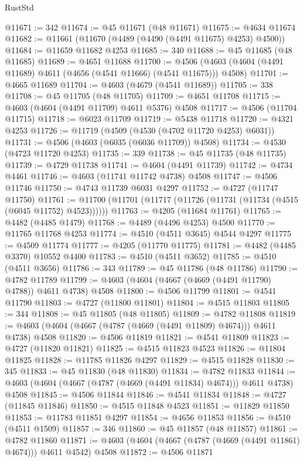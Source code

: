 \begin{lexlean}{RustStd}
\begin{coremodule}
@11671 := 342
@11674 := @45 @11671 (@48 @11671)
@11675 := @4634 @11674
@11682 := @11661 (@11670 (@4489 (@4490 (@4491 @11675) @4253) @4500))
@11684 := @11659 @11682 @4253
@11685 := 340
@11688 := @45 @11685 (@48 @11685)
@11689 := @4651 @11688
@11700 := @4506 (@4603 (@4604 (@4491 @11689) @4611 (@4656 (@4541 @11666) (@4541 @11675))) @4508)
@11701 := @4665 @11689
@11704 := @4603 (@4679 (@4541 @11689))
@11705 := 338
@11708 := @45 @11705 (@48 @11705)
@11709 := @4651 @11708
@11715 := @4603 (@4604 (@4491 @11709) @4611 @5376) @4508
@11717 := @4506 (@11704 @11715)
@11718 := @6023 @11709
@11719 := @5438 @11718
@11720 := @4321 @4253
@11726 := @11719 (@4509 (@4530 (@4702 @11720 @4253) @6031))
@11731 := @4506 (@4603 (@6035 (@6036 @11709)) @4508)
@11734 := @4530 (@4723 @11720 @4253)
@11735 := 339
@11738 := @45 @11735 (@48 @11735)
@11739 := @4729 @11738
@11741 := @4604 (@4491 @11739)
@11742 := @4734 @4461
@11746 := @4603 (@11741 @11742 @4738) @4508
@11747 := @4506 @11746
@11750 := @4743 @11739 @6031 @4297
@11752 := @4727 (@11747 @11750)
@11761 := @11700 (@11701 (@11717 (@11726 (@11731 (@11734 (@4515 (@6045 @11752) @4523))))))
@11763 := @4205 (@11684 @11761)
@11765 := @4482 (@4485 @1479)
@11768 := @4489 (@4496 @4253) @4500
@11770 := @11765 @11768 @4253
@11774 := @4510 (@4511 @3645) @4544 @4297
@11775 := @4509 @11774
@11777 := @4205 (@11770 @11775)
@11781 := @4482 (@4485 @3370) @10552 @4400
@11783 := @4510 (@4511 @3652)
@11785 := @4510 (@4511 @3656)
@11786 := 343
@11789 := @45 @11786 (@48 @11786)
@11790 := @4782 @11789
@11799 := @4603 (@4604 (@4667 (@4669 (@4491 @11790) @4788)) @4611 @4738) @4508
@11800 := @4506 @11799
@11801 := @4541 @11790
@11803 := @4727 (@11800 @11801)
@11804 := @4515 @11803
@11805 := 344
@11808 := @45 @11805 (@48 @11805)
@11809 := @4782 @11808
@11819 := @4603 (@4604 (@4667 (@4787 (@4669 (@4491 @11809) @4674))) @4611 @4738) @4508
@11820 := @4506 @11819
@11821 := @4541 @11809
@11823 := @4727 (@11820 @11821)
@11825 := @4515 @11823 @4523
@11826 := @11804 @11825
@11828 := @11785 @11826 @4297
@11829 := @4515 @11828
@11830 := 345
@11833 := @45 @11830 (@48 @11830)
@11834 := @4782 @11833
@11844 := @4603 (@4604 (@4667 (@4787 (@4669 (@4491 @11834) @4674))) @4611 @4738) @4508
@11845 := @4506 @11844
@11846 := @4541 @11834
@11848 := @4727 (@11845 @11846)
@11850 := @4515 @11848 @4523
@11851 := @11829 @11850
@11853 := @11783 @11851 @4297
@11854 := @4656 @11853
@11856 := @4510 (@4511 @1509)
@11857 := 346
@11860 := @45 @11857 (@48 @11857)
@11861 := @4782 @11860
@11871 := @4603 (@4604 (@4667 (@4787 (@4669 (@4491 @11861) @4674))) @4611 @4542) @4508
@11872 := @4506 @11871

\end{coremodule}
\end{lexlean}

